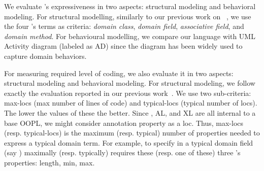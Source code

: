%

We evaluate \agldcsl’s expressiveness in two aspects: structural modeling and behavioral modeling. For structural modelling, similarly to our previous work on \dcsl~\cite{le_domain_2018},  we use the four \dcsl’s terms as criteria: \textit{domain class}, \textit{domain field}, \textit{associative field}, and \textit{domain method}. For behavioural modelling, we compare our language with UML Activity diagram (labeled as AD) since the diagram has been widely used to capture domain behaviors.



For measuring required level of coding, we also evaluate it in two aspects: structural modeling and behavioral modeling. For structural modeling, we follow exactly the evaluation reported in our previous work~\cite{le_domain_2018}. We use two sub-criteria: max-locs (max number of lines of code) and typical-locs (typical number of locs). The lower the values of these the better. Since \dcsl, AL, and XL are all internal to a base OOPL, we might consider annotation property as a loc. Thus, max-locs (resp. typical-locs) is the maximum (resp. typical) number of properties needed to express a typical domain term. 
For example, to specify in \dcsl a typical domain field (say ) maximally (resp. typically) requires these (resp. one of these) three ’s properties: length, min, max.

